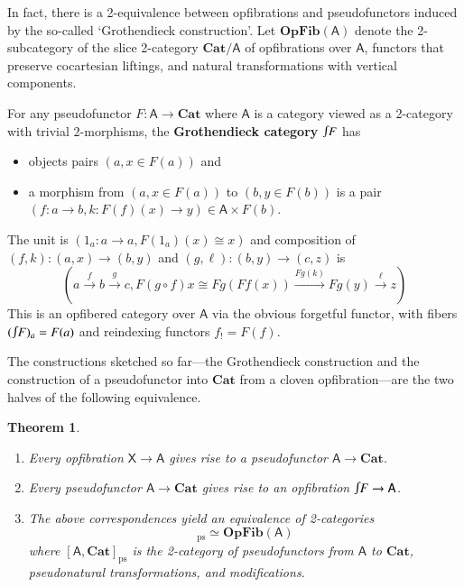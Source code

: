 \documentclass[reqno]{amsart}
\let\maps\colon
\newtheorem{thm}{Theorem}[section]
\theoremstyle{definition}
\theoremstyle{remark}
\newcommand{\A}{\mathsf{A}}
\newcommand{\X}{\mathsf{X}}
\newcommand{\bicat}{\mathbf}
\newcommand{\Cat}{\bicat{Cat}}
\newcommand{\OpFib}{\bicat{OpFib}}
\newcommand{\inta}{\raisebox{.3\depth}{$\smallint\hspace{-.01in}$}}
\newcommand{\pse}{\mathrm{ps}}
\begin{document}
In fact, there is a 2-equivalence between opfibrations and pseudofunctors induced by the so-called `Grothendieck construction'.  Let $\OpFib(\A)$ denote the 2-subcategory of the slice 2-category $\Cat/ \A$ of opfibrations over $\A$, functors that preserve cocartesian liftings, and natural transformations with vertical components.  
\begin{defn}\label{def:GrothCat}
For any pseudofunctor $F\maps\A\to\Cat$ where $\A$ is a category viewed as a 2-category with trivial 2-morphisms, the \textbf{Grothendieck category}
$\inta F$ has
\begin{itemize}
\item objects pairs $(a, x \in F(a))$ and
\item a morphism from $(a, x \in F(a))$ to $(b, y\in F(b))$ is a pair $(f \maps a \to b,k \maps F(f)(x) \to y)\in\A\times F(b)$.
\end{itemize}
The unit is $(1_a\maps a\to a,F(1_a)(x)\cong x)$ and composition of $(f,k)\maps(a,x)\to(b,y)$ and $(g,\ell)\maps(b,y)\to(c,z)$ is
\begin{displaymath}%
\left(a\xrightarrow{f}b\xrightarrow{g}c, F(g\circ f)x\cong Fg(Ff(x))\xrightarrow{Fg(k)}Fg(y)\xrightarrow{\ell}z\right) 
\end{displaymath}
This is an opfibered category over $\A$ via the obvious forgetful functor, with fibers $(\inta F)_a=F(a)$ and reindexing functors $f_!=F(f)$.
\end{defn}
The constructions sketched so far---the Grothendieck construction and the construction of a pseudofunctor into $\Cat$ from a cloven opfibration---are the two halves of the following equivalence.

\begin{thm}\label{thm:Grothendieck}\hfill
\begin{enumerate}
\item Every opfibration $\X \to \A$ gives rise to a pseudofunctor $\A \to \Cat$.
\item Every pseudofunctor $\A \to \Cat$ gives rise to an opfibration $\inta F \to\A$.
\item The above correspondences yield an equivalence of 2-categories 
\begin{displaymath}
[\A,\Cat]_\pse \simeq \OpFib(\A)
\end{displaymath}
where $[\A,\Cat]_\pse$ is the 2-category of pseudofunctors from $\A$ to $\Cat$, pseudonatural transformations, and modifications.
\end{enumerate}
\end{thm}
\end{document}
